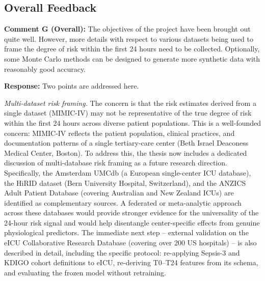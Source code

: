 \documentclass[12pt,a4paper]{article}
\begin{document}
\begin{flushleft}
\vspace{\baselineskip}


\subsection*{Overall Feedback}

\vspace{\baselineskip}

\textbf{Comment G (Overall):} The objectives of the project have been brought out quite well. However, more details with respect to various datasets being used to frame the degree of risk within the first 24 hours need to be collected. Optionally, some Monte Carlo methods can be designed to generate more synthetic data with reasonably good accuracy.

\vspace{\baselineskip}

\textbf{Response:} Two points are addressed here.

\textit{Multi-dataset risk framing.} The concern is that the risk estimates derived from a single dataset (MIMIC-IV) may not be representative of the true degree of risk within the first 24 hours across diverse patient populations. This is a well-founded concern: MIMIC-IV reflects the patient population, clinical practices, and documentation patterns of a single tertiary-care center (Beth Israel Deaconess Medical Center, Boston). To address this, the thesis now includes a dedicated discussion of multi-database risk framing as a future research direction. Specifically, the Amsterdam UMCdb (a European single-center ICU database), the HiRID dataset (Bern University Hospital, Switzerland), and the ANZICS Adult Patient Database (covering Australian and New Zealand ICUs) are identified as complementary sources. A federated or meta-analytic approach across these databases would provide stronger evidence for the universality of the 24-hour risk signal and would help disentangle center-specific effects from genuine physiological predictors. The immediate next step -- external validation on the eICU Collaborative Research Database (covering over 200 US hospitals) -- is also described in detail, including the specific protocol: re-applying Sepsis-3 and KDIGO cohort definitions to eICU, re-deriving T0--T24 features from its schema, and evaluating the frozen model without retraining.


\end{flushleft}
\end{document}
